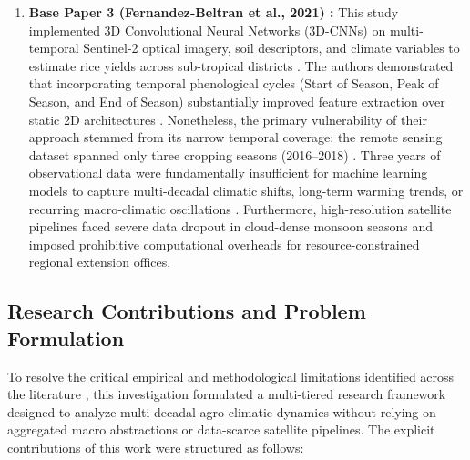 \documentclass[conference]{IEEEtran}
\begin{document}
\begin{enumerate}
    \item \textbf{Base Paper 3 (Fernandez-Beltran et al., 2021) \cite{fernandez2021}:} This study implemented 3D Convolutional Neural Networks (3D-CNNs) on multi-temporal Sentinel-2 optical imagery, soil descriptors, and climate variables to estimate rice yields across sub-tropical districts \cite{fernandez2021}. The authors demonstrated that incorporating temporal phenological cycles (Start of Season, Peak of Season, and End of Season) substantially improved feature extraction over static 2D architectures \cite{fernandez2021}. Nonetheless, the primary vulnerability of their approach stemmed from its narrow temporal coverage: the remote sensing dataset spanned only three cropping seasons (2016--2018) \cite{fernandez2021}. Three years of observational data were fundamentally insufficient for machine learning models to capture multi-decadal climatic shifts, long-term warming trends, or recurring macro-climatic oscillations \cite{lobell2008}. Furthermore, high-resolution satellite pipelines faced severe data dropout in cloud-dense monsoon seasons and imposed prohibitive computational overheads for resource-constrained regional extension offices.
\end{enumerate}

\subsection{Research Contributions and Problem Formulation}
To resolve the critical empirical and methodological limitations identified across the literature \cite{dhakal2023, crane2018, fernandez2021}, this investigation formulated a multi-tiered research framework designed to analyze multi-decadal agro-climatic dynamics without relying on aggregated macro abstractions or data-scarce satellite pipelines. The explicit contributions of this work were structured as follows:
\end{document}
